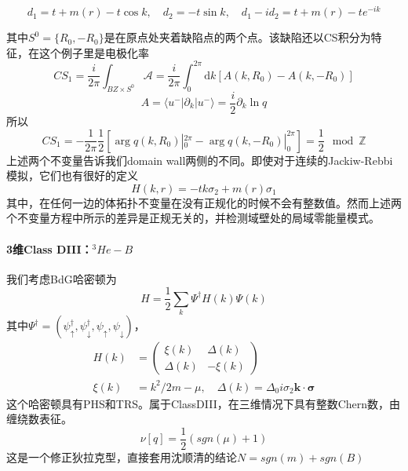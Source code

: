 \documentclass[a4paper]{article}
\numberwithin{equation}{subsection}
\begin{document}
\begin{equation}
    d_1=t+m(r)-t\cos k,\quad d_2=-t\sin k,\quad d_1-id_2=t+m(r)-te^{-ik}
\end{equation}
\begin{center}
\end{center}
其中$S^0=\{R_0,-R_0\}$是在原点处夹着缺陷点的两个点。该缺陷还以CS积分为特征，在这个例子里是电极化率
\begin{equation}
    CS_1=\frac{i}{2\pi}\int_{BZ\times S^0}\mathcal{A}=\frac{i}{2\pi}\int_{0}^{2\pi}\mathrm{d}k[A(k,R_0)-A(k,-R_0)]
\end{equation}
\begin{equation}
    A=\langle u^-|\partial_k|u^-\rangle=\frac{i}{2}\partial_k\ln q
\end{equation}
所以
\begin{equation}
    CS_1=-\frac{1}{2\pi}\frac{1}{2}[\arg q(k,R_0)|_0^{2\pi}-\arg q(k,-R_0)|_0^{2\pi}]=\frac{1}{2}\mod \mathbb{Z}
\end{equation}
上述两个不变量告诉我们domain wall两侧的不同。即使对于连续的Jackiw-Rebbi模拟，它们也有很好的定义
\begin{equation}
    H(k,r)=-tk\sigma_2+m(r)\sigma_1
\end{equation}
其中，在任何一边的体拓扑不变量在没有正规化的时候不会有整数值。然而上述两个不变量方程中所示的差异是正规无关的，并检测域壁处的局域零能量模式。  
\paragraph{3维Class DIII：$^3He-B$}
我们考虑BdG哈密顿为
\begin{equation}
    \hat{H}=\frac{1}{2}\sum_{k}\Psi^\dagger H(k)\Psi(k)
\end{equation}
其中$\Psi^\dagger=(\psi_{\uparrow}^\dagger,\psi_{\downarrow}^\dagger,\psi_{\uparrow},\psi_{\downarrow})$，
\begin{equation}
    \begin{split}
        H(k)&=\begin{pmatrix}
            \xi(k)&\Delta(k)\\
            \Delta(k)&-\xi(k)
        \end{pmatrix}\\
        \xi(k)&=k^2/2m-\mu,\quad \Delta(k)=\Delta_0i\sigma_2\mathbf{k}\cdot\bm{\sigma}
    \end{split}
\end{equation}
这个哈密顿具有PHS和TRS。属于ClassDIII，在三维情况下具有整数Chern数，由缠绕数表征。
\begin{equation}
    \nu[q]=\frac{1}{2}(sgn(\mu)+1)
\end{equation}
这是一个修正狄拉克型，直接套用沈顺清的结论$N=sgn(m)+sgn(B)$
\end{document}

